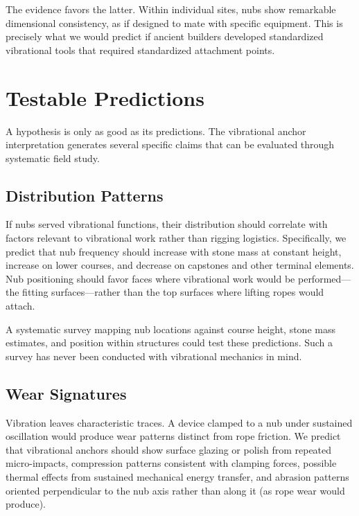 \documentclass[11pt]{article}
\begin{document}
The evidence favors the latter. Within individual sites, nubs show remarkable dimensional consistency, as if designed to mate with specific equipment. This is precisely what we would predict if ancient builders developed standardized vibrational tools that required standardized attachment points.

\section{Testable Predictions}

A hypothesis is only as good as its predictions. The vibrational anchor interpretation generates several specific claims that can be evaluated through systematic field study.

\subsection{Distribution Patterns}

If nubs served vibrational functions, their distribution should correlate with factors relevant to vibrational work rather than rigging logistics. Specifically, we predict that nub frequency should increase with stone mass at constant height, increase on lower courses, and decrease on capstones and other terminal elements. Nub positioning should favor faces where vibrational work would be performed—the fitting surfaces—rather than the top surfaces where lifting ropes would attach.

A systematic survey mapping nub locations against course height, stone mass estimates, and position within structures could test these predictions. Such a survey has never been conducted with vibrational mechanics in mind.

\subsection{Wear Signatures}

Vibration leaves characteristic traces. A device clamped to a nub under sustained oscillation would produce wear patterns distinct from rope friction. We predict that vibrational anchors should show surface glazing or polish from repeated micro-impacts, compression patterns consistent with clamping forces, possible thermal effects from sustained mechanical energy transfer, and abrasion patterns oriented perpendicular to the nub axis rather than along it (as rope wear would produce).
\end{document}
